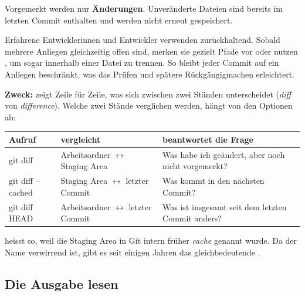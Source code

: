 Vorgemerkt werden nur \textbf{Änderungen}. Unveränderte Dateien sind bereits im letzten
Commit enthalten und werden nicht erneut gespeichert.

\begin{praxis}
Erfahrene Entwicklerinnen und Entwickler verwenden  zurückhaltend. Sobald
mehrere Anliegen gleichzeitig offen sind, merken sie gezielt Pfade vor oder nutzen
, um sogar innerhalb einer Datei zu trennen. So bleibt jeder Commit auf ein
Anliegen beschränkt, was das Prüfen und spätere Rückgängigmachen erleichtert.
\end{praxis}


\textbf{Zweck:} zeigt Zeile für Zeile, was sich zwischen zwei Ständen unterscheidet
(\emph{diff} von \emph{difference}). Welche zwei Stände verglichen werden, hängt von den
Optionen ab:

\begin{center}
\renewcommand{\arraystretch}{1.3}
\begin{tabularx}{\linewidth}{@{}>{\ttfamily}l>{\raggedright\arraybackslash}p{4.4cm}>{\raggedright\arraybackslash}X@{}}
  \toprule
  \normalfont\textbf{Aufruf} & \textbf{vergleicht} & \textbf{beantwortet die Frage} \\
  \midrule
  git diff          & Arbeitsordner $\leftrightarrow$ Staging Area & Was habe ich geändert, aber noch nicht vorgemerkt? \\
  git diff --cached & Staging Area $\leftrightarrow$ letzter Commit & Was kommt in den nächsten Commit? \\
  git diff HEAD     & Arbeitsordner $\leftrightarrow$ letzter Commit & Was ist insgesamt seit dem letzten Commit anders? \\
  \bottomrule
\end{tabularx}
\end{center}

\begin{hintergrund}
 heisst so, weil die Staging Area in Git intern früher \emph{cache} genannt
wurde. Da der Name verwirrend ist, gibt es seit einigen Jahren das gleichbedeutende
.
\end{hintergrund}

\subsection*{Die Ausgabe lesen}

